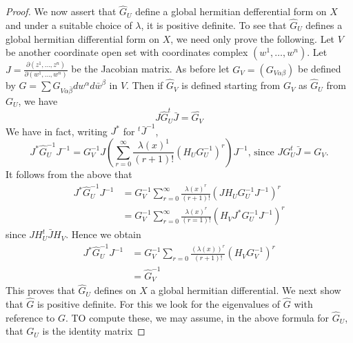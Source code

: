 \documentclass[lang=en,12pt]{beautybook}
\begin{document}
\begin{proof}
  We now assert that $\widehat{G}_U$ define a global hermitian defferential form on $X$ and under a suitable choice of $\lambda$, it is positive definite. To see that $\widehat{G}_U$ defines a global hermitian differential form on $X$, we need only prove the following. Let $V$ be another coordinate open set with coordinates complex $\left(w^1, \ldots, w^n\right)$. Let $J=\frac{\partial\left(z^1, \ldots, z^n\right)}{\partial\left(w^1, \ldots, w^n\right)}$ be the Jacobian matrix. As before let $G_V=\left(G_{V \alpha \beta}\right)$ be defined by $G=\sum G_{V \alpha \bar{\beta}} d w^\alpha d \bar{w}^\beta$ in $V$. Then if $\widehat{G}_V$ is defined starting from $G_V$ as $\widehat{G}_U$ from $G_U$, we have
  \begin{equation*}
    J \widehat{G}_U^t \bar{J}=\widehat{G_V}
  \end{equation*}
  We have in fact, writing $J^*$ for $^t \bar{J}^{-1}$,
  \begin{equation*}
    J^* \widehat{G}_U^{-1} J^{-1}=G_V^{-1} J\left(\sum_{r=0}^{\infty} \frac{\lambda(x)^1}{(r+1) !}\left(H_U G_U^{-1}\right)^r\right) J^{-1} \text {, since } J G_U^t \bar{J}=G_V .
  \end{equation*}
  It follows from the above that
  \begin{equation*}
    \begin{aligned}
      J^* \widehat{G}_U^{-1} J^{-1} & =G_V^{-1} \sum_{r=0}^{\infty} \frac{\lambda(x)^r}{(r+1) !}\left(J H_U G_U^{-1} J^{-1}\right)^r   \\
                                    & =G_V^{-1} \sum_{r=0}^{\infty} \frac{\lambda(x)^r}{(r=1) !}\left(H_V J^* G_U^{-1} J^{-1}\right)^r
    \end{aligned}
  \end{equation*}
  since $J H_U^t \bar{J} H_V$. Hence we obtain
  \begin{equation*}
    \begin{aligned}
      J^* \widehat{G}_U^{-1} J^{-1} & =G_V^{-1} \sum_{r=0} \frac{(\lambda(x))^r}{(r+1) !}\left(H_V G_V^{-1}\right)^r \\
                                    & =\widehat{G}_V^{-1}
    \end{aligned}
  \end{equation*}
  This proves that $\widehat{G}_U$ defines on $X$ a global hermitian differential. We next show that $\widehat{G}$ is positive definite. For this we look for the eigenvalues of $\widehat{G}$ with reference to $G$. TO compute these, we may assume, in the above formula for $\widehat{G}_U$, that $G_U$ is the identity matrix

\end{proof}
\end{document}
